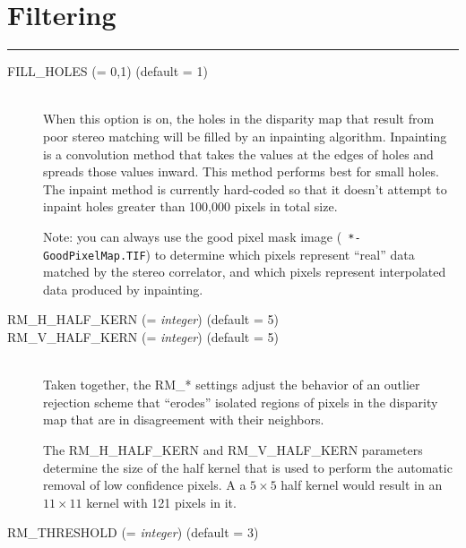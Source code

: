
\section{Filtering}
\hrule
\bigskip

\begin{description}

\item[FILL\_HOLES \textnormal{\small{(= 0,1)}} (default = 1)] \hfill \\

  When this option is on, the holes in the disparity map that result
  from poor stereo matching will be filled by an inpainting
  algorithm. Inpainting is a convolution method that takes the values
  at the edges of holes and spreads those values inward. This method
  performs best for small holes. The inpaint method is currently
  hard-coded so that it doesn't attempt to inpaint holes greater than
  100,000 pixels in total size.

  Note: you can always use the good pixel mask image ({\tt
    *-GoodPixelMap.TIF}) to determine which pixels represent ``real''
  data matched by the stereo correlator, and which pixels represent
  interpolated data produced by inpainting.

\item[RM\_H\_HALF\_KERN \textnormal{\small{(= \emph{integer})}} (default = 5)]
\item[RM\_V\_HALF\_KERN \textnormal{\small{(= \emph{integer})}} (default = 5)] \hfill \\

  Taken together, the RM\_* settings adjust the behavior of an outlier
  rejection scheme that ``erodes'' isolated regions of pixels in the
  disparity map that are in disagreement with their neighbors.  

  The RM\_H\_HALF\_KERN and RM\_V\_HALF\_KERN parameters determine the
  size of the half kernel that is used to perform the automatic
  removal of low confidence pixels.  A a $5 \times 5$ half kernel
  would result in an $11 \times 11$ kernel with 121 pixels in it.

\item[RM\_THRESHOLD \textnormal{\small{(= \emph{integer})}} (default = 3)] \hfill \\
  

\end{description}
